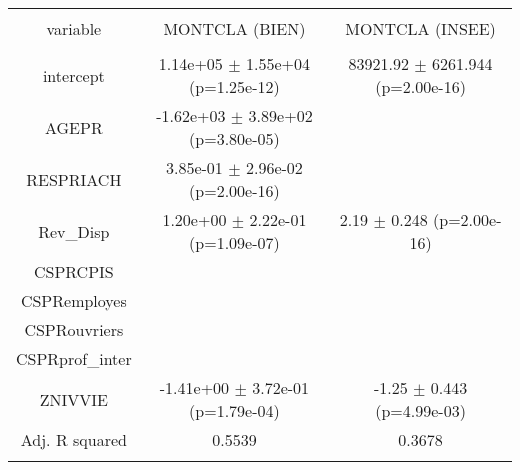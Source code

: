 \begin{table*}[!htbp] \centering 
  \caption{} 
  \label{} 
\begin{tabular}{@{\extracolsep{5pt}} ccc} 
\\[-1.8ex]\hline 
\hline \\[-1.8ex] 
variable & MONTCLA (BIEN) & MONTCLA (INSEE) \\ 
\hline \\[-1.8ex] 
intercept &  1.14e+05 $\pm$ 1.55e+04 (p=1.25e-12) & 83921.92 $\pm$ 6261.944 (p=2.00e-16) \\ 
AGEPR & -1.62e+03 $\pm$ 3.89e+02 (p=3.80e-05) &  \\ 
RESPRIACH &  3.85e-01 $\pm$ 2.96e-02 (p=2.00e-16) &  \\ 
Rev\_Disp &  1.20e+00 $\pm$ 2.22e-01 (p=1.09e-07) &     2.19 $\pm$    0.248 (p=2.00e-16) \\ 
CSPRCPIS &  &  \\ 
CSPRemployes &  &  \\ 
CSPRouvriers &  &  \\ 
CSPRprof\_inter &  &  \\ 
ZNIVVIE & -1.41e+00 $\pm$ 3.72e-01 (p=1.79e-04) &    -1.25 $\pm$    0.443 (p=4.99e-03) \\ 
\hline Adj. R squared & 0.5539 & 0.3678 \\ 
\hline \\[-1.8ex] 
\end{tabular} 
\end{table*}



